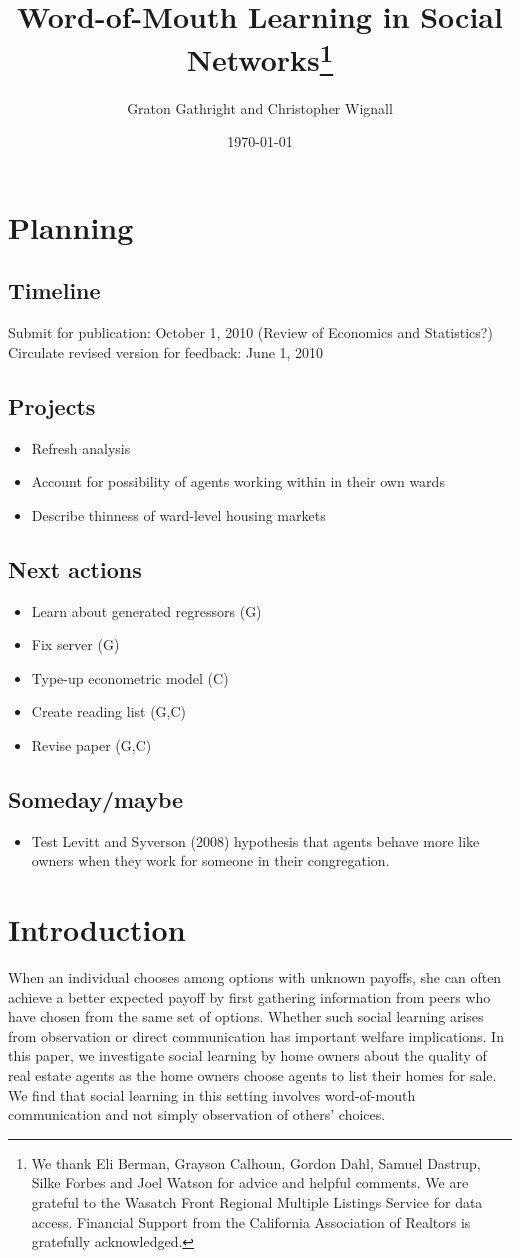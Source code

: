 \documentclass[12pt]{article}
\title{Word-of-Mouth Learning in Social Networks\thanks{We thank Eli Berman, Grayson Calhoun, Gordon Dahl, Samuel Dastrup, Silke Forbes and Joel Watson for advice and helpful comments.  We are grateful to the Wasatch Front Regional Multiple Listings Service for data access.  Financial Support from the California Association of Realtors is gratefully acknowledged.}}
\author{Graton Gathright and Christopher Wignall}
\date{\today}
\begin{document}
\maketitle
\section{Planning}
\subsection{Timeline}
Submit for publication: October 1, 2010 (Review of Economics and Statistics?)
Circulate revised version for feedback: June 1, 2010
\subsection{Projects}
\begin{itemize}
    \item Refresh analysis
    \item Account for possibility of agents working within in their own wards
    \item Describe thinness of ward-level housing markets
\end{itemize}
\subsection{Next actions}
\begin{itemize}
    \item Learn about generated regressors (G)
    \item Fix server (G)
    \item Type-up econometric model (C)
    \item Create reading list (G,C)
    \item Revise paper (G,C)
    
\end{itemize}
\subsection{Someday/maybe}
\begin{itemize}
    \item Test Levitt and Syverson (2008) hypothesis that agents behave more like owners when they work for someone in their congregation.
\end{itemize}
\section{Introduction}
    When an individual chooses among options with unknown payoffs, she can often achieve a better expected payoff by first gathering information from peers who have chosen from the same set of options. Whether such social learning arises from observation or direct communication has important welfare implications. In this paper, we investigate social learning by home owners about the quality of real estate agents as the home owners
    choose agents to list their homes for sale.  We find that social learning in this setting involves word-of-mouth communication and not simply observation of others' choices.
    
\end{document}
